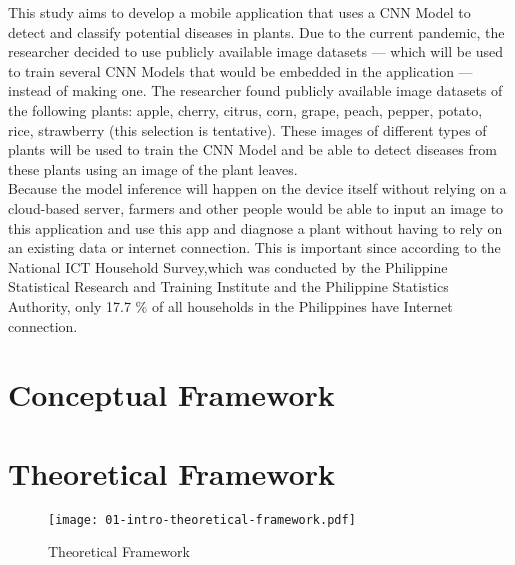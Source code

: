 
This study aims to develop a mobile application that uses a 
CNN Model  to detect and classify potential diseases in 
plants. Due to the current pandemic, the researcher decided to use publicly 
available image datasets — which will be used to train several CNN Models 
that would be embedded in the application — instead of making one. The researcher 
found publicly available image datasets of the following plants:
apple, cherry, citrus, corn, grape, peach, pepper, potato,
rice, strawberry (this selection is tentative). These images of different types 
of plants will be used to train the CNN Model and be able to detect diseases from 
these plants using an image of the plant leaves. \\ 

Because the model inference will
happen on the device itself without relying on a cloud-based server, 
farmers and other people would be able to input an image to this application 
and use this app and diagnose a plant without having to rely on an 
existing data or internet connection. This is important since according to 
the  National ICT Household Survey,which was conducted by the Philippine Statistical 
Research and Training Institute and the Philippine Statistics Authority, only 
17.7 \% of all households in the Philippines have Internet connection. 


\newpage 

\section{Conceptual Framework}

\section{Theoretical Framework}
\begin{figure}[h!]
      \centering
      \texttt{[image: 01-intro-theoretical-framework.pdf]}
      \caption{Theoretical Framework}
\end{figure}


